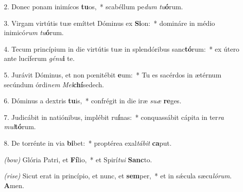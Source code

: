  2. Donec ponam inimícos \textbf{tu}os,~*
	scabéllum pe\textit{dum} \textit{tu}\textbf{ó}rum.
	
3. Virgam virtútis tuæ emíttet Dóminus ex \textbf{Si}on:~*
	domináre in médio inimicó\textit{rum} \textit{tu}\textbf{ó}rum.
	
4. Tecum princípium in die virtútis tuæ in splendóribus sanc\textbf{tó}rum:~*
	ex útero ante lucíferum \textit{gé}\textit{nu}\textbf{i} te.
	
5. Jurávit Dóminus, et non p{\oe}nitébit \textbf{e}um:~*
	Tu es sacérdos in ætérnum secúndum órdi\textit{nem} \textit{Mel}\textbf{chí}se\-dech.
	
6. Dóminus a dextris \textbf{tu}is,~* 
	confrégit in die iræ \textit{su}\textit{æ} \textbf{re}ges.
	
7. Judicábit in natiónibus, implébit ru\textbf{í}nas:~*
	conquassábit cápita in ter\textit{ra} \textit{mul}\textbf{tó}rum.
	
8. De torrénte in via \textbf{bi}bet:~*
	proptérea exal\textit{tá}\textit{bit} \textbf{ca}put.

\textit{(bow)} Glória Patri, et \textbf{Fí}lio,~*
	et Spirí\textit{tu}\textit{i} \textbf{Sanc}to.
	
\textit{(rise)} Sicut erat in princípio, et nunc, et \textbf{sem}per,~*
	et in s\'{\ae}cula sæcu\textit{ló}\textit{rum}. \textbf{A}men.
